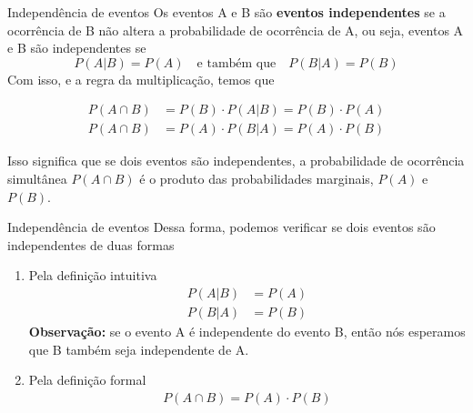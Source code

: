 \documentclass[10pt]{beamer}\usepackage[]{graphicx}\usepackage[]{color}
\theoremstyle{definition}
\begin{document}
\begin{frame}{Independência de eventos}
  Os eventos A e B são \textbf{eventos independentes} se a ocorrência de
  B não altera a probabilidade de ocorrência de A, ou seja, eventos A e
  B são independentes se
  \begin{equation*}
    P(A|B) = P(A) \quad \text{e também que} \quad P(B|A) = P(B)
  \end{equation*}
  Com isso, e a regra da multiplicação, temos que
  \begin{block}{}
    \begin{align*}
      P(A \cap B) &= P(B) \cdot P(A|B) = P(B) \cdot P(A) \\
      P(A \cap B) &= P(A) \cdot P(B|A) = P(A) \cdot P(B)
    \end{align*}
  \end{block}
  Isso significa que se dois eventos são independentes, a probabilidade
  de ocorrência simultânea $P(A \cap B)$ é o produto das probabilidades
  marginais, $P(A)$ e $P(B)$.
\end{frame}

\begin{frame}{Independência de eventos}
  Dessa forma, podemos verificar se dois eventos são independentes de
  duas formas
  \begin{enumerate}
  \item Pela definição intuitiva
    \begin{align*}
      P(A|B) &= P(A) \\
      P(B|A) &= P(B)
    \end{align*}
    \textbf{Observação:} se o evento A é independente do evento B, então
    nós esperamos que B também seja independente de A.
  \item Pela definição formal
    \begin{align*}
      P(A \cap B) = P(A) \cdot P(B)
    \end{align*}
  \end{enumerate}
\end{frame}
\end{document}
